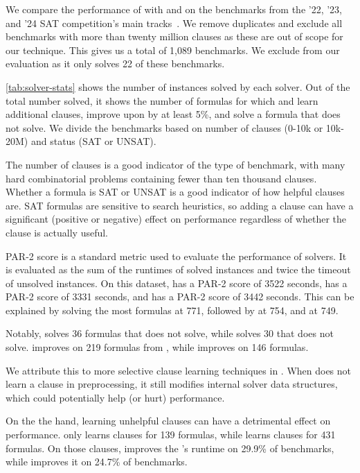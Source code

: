 We compare the performance of \tool with \cadical and \prelearn on the
benchmarks from the '22, '23, and '24 SAT competition's main
tracks~\cite{satcomp2022,satcomp2023,satcomp2024}. We remove duplicates and
exclude all benchmarks with more than twenty million clauses as these are out of
scope for our technique. This gives us a total of 1,089 benchmarks. We exclude
\sadical from our evaluation as it only solves 22 of these benchmarks.

\autoref{tab:solver-stats} shows the number of instances solved by each solver.
Out of the total number solved, it shows the number of formulas for which
\prelearn and \cadical learn additional \pr clauses, improve upon \cadical by at
least 5\%, and solve a formula that \cadical does not solve. We divide the
benchmarks based on number of clauses (0-10k or 10k-20M) and status (SAT or
UNSAT). 

The number of clauses is a good indicator of the type of benchmark, with many
hard combinatorial problems containing fewer than ten thousand clauses.
Whether a formula is SAT or UNSAT is a good indicator of how helpful \pr clauses
are. SAT formulas are sensitive to search heuristics, so adding a \pr clause can
have a significant (positive or negative) effect on performance regardless of
whether the clause is actually useful.

PAR-2 score is a standard metric used to evaluate the performance of solvers. It
is evaluated as the sum of the runtimes of solved instances and twice the
timeout of unsolved instances. On this dataset, \cadical has a PAR-2 score of
3522 seconds, \prelearn has a PAR-2 score of 3331 seconds, and \tool has a
PAR-2 score of 3442 seconds. This can be explained by \prelearn solving the
most formulas at 771, followed by \tool at 754, and \cadical at 749.

Notably, \tool solves 36 formulas that \cadical does not solve, while \prelearn
solves 30 that \cadical does not solve. \tool improves on 219 formulas from
\cadical, while \prelearn improves on 146 formulas. 

We attribute this to more selective \pr clause learning techniques in \tool.
When \tool does not learn a \pr clause in preprocessing, it still modifies
internal solver data structures, which could potentially help (or hurt)
performance.

On the the hand, learning unhelpful \pr clauses can have a detrimental effect
on performance. \tool only learns \pr clauses for 139 formulas, while
\prelearn learns \pr clauses for 431 formulas. On those clauses,
\tool improves the \cadical's runtime on 29.9\% of benchmarks, while \prelearn
improves it on 24.7\% of benchmarks.

